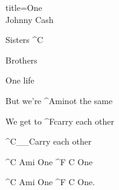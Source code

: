 \begin{song}{title=\centering One \\\normalsize Johnny Cash  \vspace*{-0.3cm}}
{\begin{minipage}[t]{0.55\textwidth}
 	 Sisters ^{C}
 
 	 Brothers
   
  	One life
 
  	But we're ^{Ami}not the same

  	We get to ^{F}carry each other

  	^{C{\color{white}\_\_}}Carry each other

  	^{C\,\,Ami\,\,}One ^{F\,\,C\,\,}One

  	^{C\,\,Ami\,\,}One ^{F\,\,C\,\,}One.

\normalsize


\end{minipage}
}
\setcounter{Slokočet}{0}
\end{song}
